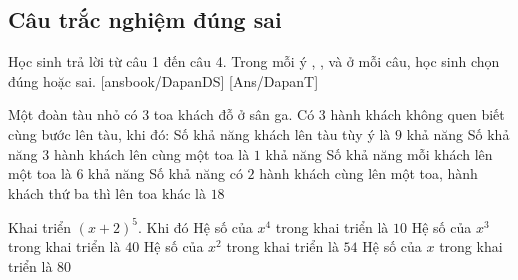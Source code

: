 \subsection{Câu trắc nghiệm đúng sai}
Học sinh trả lời từ câu 1 đến câu 4.
Trong mỗi ý , ,  và  ở mỗi câu, học sinh chọn đúng hoặc sai.
\setcounter{ex}{0}
\LGexTF
{}[ansbook/DapanDS]
[Ans/DapanT]
 \begin{ex}%
 	Một đoàn tàu nhỏ có $3$ toa khách đỗ ở sân ga. Có $3$ hành khách không quen biết cùng bước lên tàu, khi đó:
 	\choiceTF
	{Số khả năng khách lên tàu tùy ý là $9$ khả năng}
	{Số khả năng $3$ hành khách lên cùng một toa là $1$ khả năng}
	{\True Số khả năng mỗi khách lên một toa là $6$ khả năng}
	{\True Số khả năng có $2$ hành khách cùng lên một toa, hành khách thứ ba thì lên toa khác là $18$} 
 \end{ex}
\begin{ex}%
	Khai triển $(x+2)^5$. Khi đó
	\choiceTF
	{\True Hệ số của $x^4$ trong khai triển là $10$}
	{\True Hệ số của $x^3$ trong khai triển là $40$}
	{Hệ số của $x^2$ trong khai triển là $54$}
	{\True Hệ số của $x$ trong khai triển là $80$} 
\end{ex}

